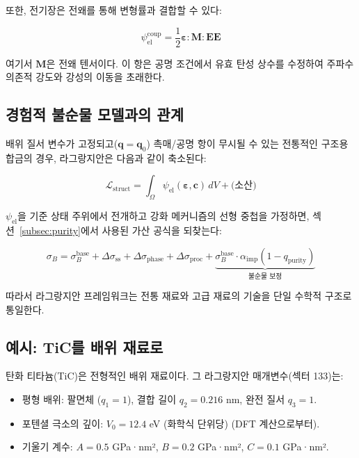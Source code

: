 \documentclass[12pt,a4paper]{article}
\begin{document}
	또한, 전기장은 전왜를 통해 변형률과 결합할 수 있다:
	
	\[
	\psi_{\mathrm{el}}^{\mathrm{coup}} = \frac{1}{2} \boldsymbol{\varepsilon} : \mathbf{M} : \mathbf{E}\mathbf{E}
	\]
	
	여기서 \(\mathbf{M}\)은 전왜 텐서이다. 이 항은 공명 조건에서 유효 탄성 상수를 수정하여 주파수 의존적 강도와 강성의 이동을 초래한다.
	
	\subsection{경험적 불순물 모델과의 관계}
	\label{subsec:relation-empirical}
	
	배위 질서 변수가 고정되고(\(\mathbf{q} = \mathbf{q}_0\)) 촉매/공명 항이 무시될 수 있는 전통적인 구조용 합금의 경우, 라그랑지안은 다음과 같이 축소된다:
	
	\[
	\mathcal{L}_{\mathrm{struct}} = \int_{\Omega} \psi_{\mathrm{el}}(\boldsymbol{\varepsilon}, \mathbf{c}) \, dV + \text{(소산)}
	\]
	
	\(\psi_{\mathrm{el}}\)을 기준 상태 주위에서 전개하고 강화 메커니즘의 선형 중첩을 가정하면, 섹션~\ref{subsec:purity}에서 사용된 가산 공식을 되찾는다:
	
	\[
	\sigma_B = \sigma_B^{\mathrm{base}} + \Delta\sigma_{\mathrm{ss}} + \Delta\sigma_{\mathrm{phase}} + \Delta\sigma_{\mathrm{proc}} + \underbrace{\sigma_B^{\mathrm{base}} \cdot \alpha_{\mathrm{imp}} (1 - q_{\mathrm{purity}})}_{\text{불순물 보정}}
	\]
	
	따라서 라그랑지안 프레임워크는 전통 재료와 고급 재료의 기술을 단일 수학적 구조로 통일한다.
	
	\subsection{예시: TiC를 배위 재료로}
	\label{subsec:example-tic}
	
	탄화 티타늄(TiC)은 전형적인 배위 재료이다. 그 라그랑지안 매개변수(섹터 133)는:
	
	\begin{itemize}
		\item 평형 배위: 팔면체 (\(q_1=1\)), 결합 길이 \(q_2 = 0.216\) nm, 완전 질서 \(q_3=1\).
		\item 포텐셜 극소의 깊이: \(V_0 = 12.4\) eV (화학식 단위당) (DFT 계산으로부터).
		\item 기울기 계수: \(A=0.5\) GPa·nm², \(B=0.2\) GPa·nm², \(C=0.1\) GPa·nm².
	\end{itemize}
	
\end{document}
